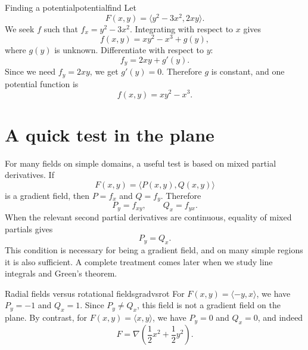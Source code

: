 \documentclass[11pt]{article}
\newcommand{\grad}{\nabla}
\begin{document}
\begin{examplebox}{Finding a potential}{potentialfind}
Let
\[
F(x,y)=\langle y^2-3x^2,2xy\rangle.
\]
We seek $f$ such that $f_x=y^2-3x^2$. Integrating with respect to $x$ gives
\[
f(x,y)=xy^2-x^3+g(y),
\]
where $g(y)$ is unknown. Differentiate with respect to $y$:
\[
f_y=2xy+g'(y).
\]
Since we need $f_y=2xy$, we get $g'(y)=0$. Therefore $g$ is constant, and one potential function is
\[
f(x,y)=xy^2-x^3.
\]
\end{examplebox}

\section{A quick test in the plane}

For many fields on simple domains, a useful test is based on mixed partial derivatives. If
\[
F(x,y)=\langle P(x,y),Q(x,y)\rangle
\]
is a gradient field, then $P=f_x$ and $Q=f_y$. Therefore
\[
P_y=f_{xy},\qquad Q_x=f_{yx}.
\]
When the relevant second partial derivatives are continuous, equality of mixed partials gives
\[
P_y=Q_x.
\]
This condition is necessary for being a gradient field, and on many simple regions it is also sufficient. A complete treatment comes later when we study line integrals and Green's theorem.

\begin{examplebox}{Radial fields versus rotational fields}{gradvsrot}
For $F(x,y)=\langle -y,x\rangle$, we have $P_y=-1$ and $Q_x=1$. Since $P_y\ne Q_x$, this field is not a gradient field on the plane. By contrast, for $F(x,y)=\langle x,y\rangle$, we have $P_y=0$ and $Q_x=0$, and indeed
\[
F=\grad\left(\frac12x^2+\frac12y^2\right).
\]
\end{examplebox}
\end{document}
